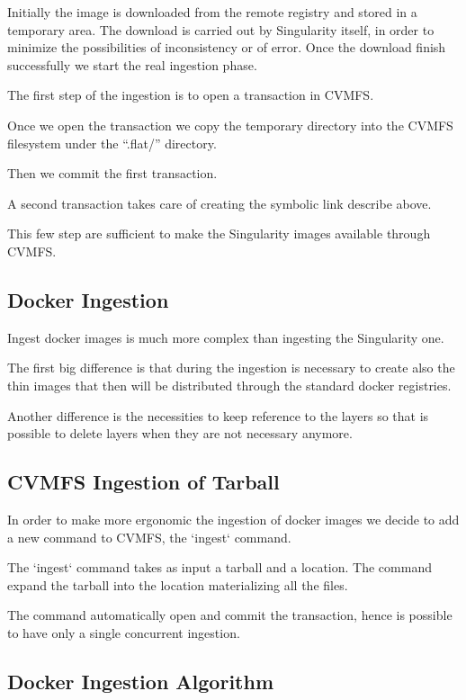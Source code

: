Initially the image is downloaded from the remote registry and stored in a
temporary area. The download is carried out by Singularity itself, in order to
minimize the possibilities of inconsistency or of error. Once the download
finish successfully we start the real ingestion phase.

The first step of the ingestion is to open a transaction in CVMFS.

Once we open the transaction we copy the temporary directory into the CVMFS
filesystem under the “.flat/” directory.

Then we commit the first transaction.

A second transaction takes care of creating the symbolic link describe above.

This few step are sufficient to make the Singularity images available through
CVMFS.

\subsection{Docker Ingestion}

Ingest docker images is much more complex than ingesting the Singularity one.

The first big difference is that during the ingestion is necessary to create
also the thin images that then will be distributed through the standard docker
registries.

Another difference is the necessities to keep reference to the layers so that
is possible to delete layers when they are not necessary anymore.

\subsection{CVMFS Ingestion of Tarball}

In order to make more ergonomic the ingestion of docker images we decide to add
a new command to CVMFS, the `ingest` command.

The `ingest` command takes as input a tarball and a location. The command
expand the tarball into the location materializing all the files.

The command automatically open and commit the transaction, hence is possible to
have only a single concurrent ingestion.

\subsection{Docker Ingestion Algorithm}

